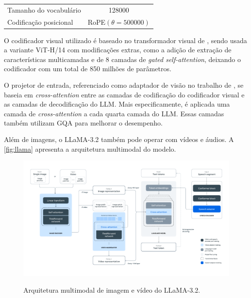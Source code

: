 \begin{table}[ht]
\begin{tabular}{l|ccc}
            Tamanho do vocabulário                 & \multicolumn{3}{c}{128000}                                                                                                                               \\
            Codificação posicional                 & \multicolumn{3}{c}{\ac{RoPE}\begin{math}(\theta = 500000)\end{math}}                                                                                     \\ \hline
      \end{tabular}
      \label{tab:llama3_architecture}
\end{table}

O codificador visual utilizado é baseado no transformador visual de \textcite{dosovitskiy2020image}, sendo usada a variante \ac{ViT}-H/14 com modificações extras, como
a adição de extração de características multicamadas e de 8 camadas de \textit{gated self-attention}, deixando o codificador com um total de 850 milhões de parâmetros.

O projetor de entrada, referenciado como adaptador de visão no trabalho de \textcite{dubey2024llama}, se baseia em \textit{cross-attention} entre as camadas de
codificação do codificador visual e as camadas de decodificação do \ac{LLM}. Mais especificamente, é aplicada uma camada de \textit{cross-attention} a cada quarta camada
do \ac{LLM}. Essas camadas também utilizam \ac{GQA} para melhorar o desempenho.

Além de imagens, o \ac{LLaMA}-3.2 também pode operar com vídeos e áudios. A \autoref{fig:llama} apresenta a arquitetura multimodal do modelo.

\begin{figure}[ht]
      \centering
      \caption{\small Arquitetura multimodal de imagem e vídeo do \ac{LLaMA}-3.2.}
      \includegraphics[width=1.0\columnwidth,keepaspectratio]{images/llama.pdf}
      \label{fig:llama}
\end{figure}
